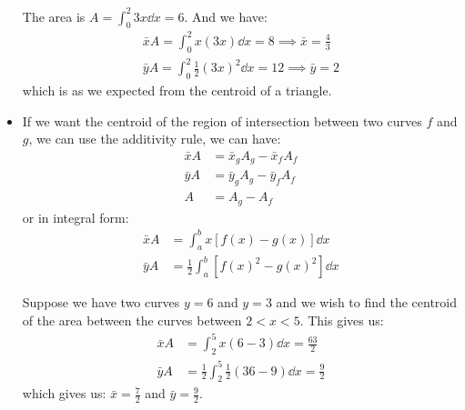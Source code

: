 \begin{itemize}
\begin{example}
\begin{center}
        \end{center}
        The area is $A = \int_0^2 3x \dd{x} = 6$. And we have:
        \begin{align}
            \bar{x}A = \int_0^2 x(3x) \dd{x} = 8 \implies \bar{x} = \frac{4}{3} \\ 
            \bar{y}A = \int_0^2 \frac{1}{2}(3x)^2 \dd{x} = 12 \implies \bar{y} = 2
        \end{align}
        which is as we expected from the centroid of a triangle.
    \end{example}
    \item If we want the centroid of the region of intersection between two curves $f$ and $g$, we can use the additivity rule, we can have:
    \begin{align}
        \bar{x}A &= \bar{x}_g A_g - \bar{x}_fA_f \\ 
        \bar{y}A &= \bar{y}_g A_g - \bar{y}_fA_f \\
        A &= A_g - A_f
    \end{align}
    or in integral form:
    \begin{align}
        \bar{x}A &= \int_a^b x\left[f(x)-g(x)\right] \dd{x} \\ 
        \bar{y}A &= \frac{1}{2}\int_a^b \left[f(x)^2-g(x)^2\right] \dd{x}
    \end{align}
    \begin{example}
        Suppose we have two curves $y=6$ and $y=3$ and we wish to find the centroid of the area between the curves between $2<x<5$. This gives us:
        \begin{align}
            \bar{x}A &= \int_2^5 x(6-3) \dd{x} = \frac{63}{2} \\
            \bar{y}A &= \frac{1}{2} \int_2^5 \frac{1}{2}(36-9)\dd{x} = \frac{9}{2}
        \end{align}
        which gives us: $\bar{x} = \frac{7}{2}$ and $\bar{y} = \frac{9}{2}$.

\end{example}
\end{itemize}
